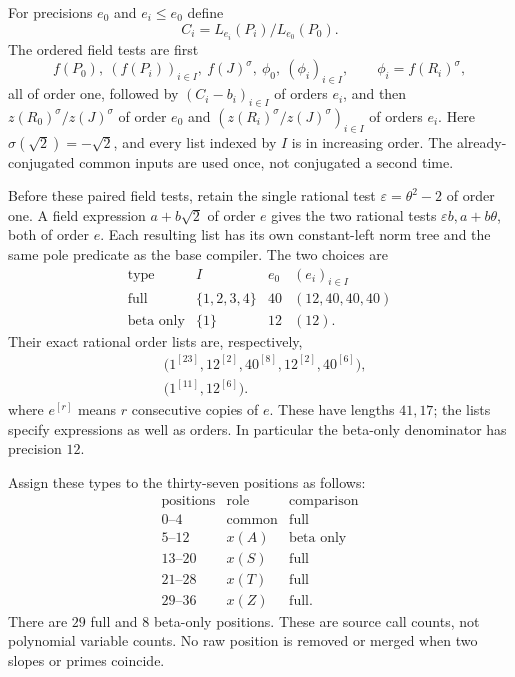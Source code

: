 For precisions $e_0$ and $e_i\le e_0$ define
\[
 C_i=L_{e_i}(P_i)/L_{e_0}(P_0).
\]
The ordered field tests are first
\[
 f(P_0),\ (f(P_i))_{i\in I},\ f(J)^\sigma,
 \ \phi_0,\ (\phi_i)_{i\in I},
 \qquad \phi_i=f(R_i)^\sigma,
\]
all of order one, followed by $(C_i-b_i)_{i\in I}$ of orders $e_i$,
and then $z(R_0)^\sigma/z(J)^\sigma$ of order $e_0$ and
$(z(R_i)^\sigma/z(J)^\sigma)_{i\in I}$ of orders $e_i$.
Here $\sigma(\sqrt2)=-\sqrt2$, and every list indexed by $I$ is in
increasing order. The already-conjugated common inputs are used once,
not conjugated a second time.

Before these paired field tests, retain the single rational test
$\varepsilon=\theta^2-2$ of order one. A field expression
$a+b\sqrt2$ of order $e$ gives the two rational tests
$\varepsilon b,a+b\theta$, both of order $e$.
Each resulting list has its own constant-left norm tree and the same
pole predicate as the base compiler. The two choices are
\[
\begin{array}{c|c|c|c}
 \text{type}&I&e_0&(e_i)_{i\in I}\\ \hline
 \text{full}&\{1,2,3,4\}&40&(12,40,40,40)\\
 \text{beta only}&\{1\}&12&(12).
\end{array}
\]
Their exact rational order lists are, respectively,
\begin{align*}
 &\bigl(1^{[23]},12^{[2]},40^{[8]},12^{[2]},40^{[6]}\bigr),\\
 &\bigl(1^{[11]},12^{[6]}\bigr).
\end{align*}
where $e^{[r]}$ means $r$ consecutive copies of $e$.
These have lengths $41,17$; the lists specify expressions as well as
orders. In particular the beta-only denominator has precision $12$.

Assign these types to the thirty-seven positions as follows:
\begin{equation}\label{eq:quartic-mode-partition}
\begin{array}{c|c|c}
 \text{positions}&\text{role}&\text{comparison}\\ \hline
 0\text{--}4&\text{common}&\text{full}\\
 5\text{--}12&x(A)&\text{beta only}\\
 13\text{--}20&x(S)&\text{full}\\
 21\text{--}28&x(T)&\text{full}\\
 29\text{--}36&x(Z)&\text{full}.
\end{array}
\end{equation}
There are $29$ full and $8$ beta-only positions. These are
source call counts, not polynomial variable counts. No raw position is
removed or merged when two slopes or primes coincide.


